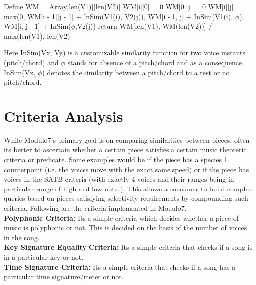 \begin{algorithm}

\label{SMAlgorithm}
\begin{algorithmic}[1]
 {}
\State Define WM = Array[len(V1)][len(V2)]
\State WM[i][0] = 0
\EndFor
{}
\State WM[0][j] = 0
\EndFor
{}
\State WM[i][j] = max(0, WM[i - 1][j - 1] + InSim(V1(i), V2(j)), WM[i - 1, j] + InSim(V1(i), $\phi$), WM[i, j - 1] + InSim($\phi$,V2(j))
\EndFor
\EndFor
\State return WM[len(V1), WM(len(V2))] / max(len(V1), len(V2)
\EndProcedure
\end{algorithmic}
\end{algorithm}

\noindent Here InSim(Vx, Vy) is a customizable similarity function for two voice instants (pitch/chord) and $\phi$ stands for absence of a pitch/chord and as a consequence  InSim(Vx, $\phi$) denotes the similarity between a pitch/chord to a rest or no pitch/chord.  

\section{Criteria Analysis} \label{criteria}

\noindent While Modulo7's primary goal is on comparing similarities between pieces, often its better to ascertain whether a certain piece satisfies a certain music theoretic criteria or predicate. Some examples would be if the piece has a species 1 counterpoint (i.e. the voices move with the exact same speed) or if the piece has voices in the SATB criteria (with exactly 4 voices and their ranges being in particular range of high and low notes). This allows a consumer to build complex queries based on pieces satisfying selectivity requirements by compounding such criteria. Following are the criteria implemented in Modulo7. \\

\noindent \textbf{Polyphonic Criteria:} Its a simple criteria which decides whether a piece of music is polyphonic or not. This is decided on the basis of the number of voices in the song. \\

\noindent \textbf{Key Signature Equality Criteria:} Its a simple criteria that checks if a song is in a particular key or not. \\

\noindent \textbf{Time Signature Criteria:} Its a simple criteria that checks if a song has a particular time signature/meter or not. \\

